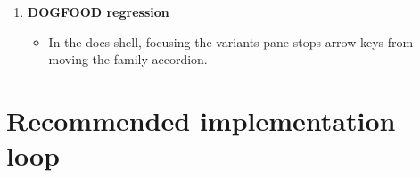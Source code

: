 \begin{enumerate}
  \begin{itemize}
  \tightlist
  \item
    The full help surface shows the active pane's bindings instead of stale page-global guidance.
  \end{itemize}
\item
  \textbf{DOGFOOD regression}

  \begin{itemize}
  \tightlist
  \item
    In the docs shell, focusing the variants pane stops arrow keys from moving the family accordion.
  \end{itemize}
\end{enumerate}

\section{Recommended implementation loop}\label{record-044-recommended-implementation-loop}

